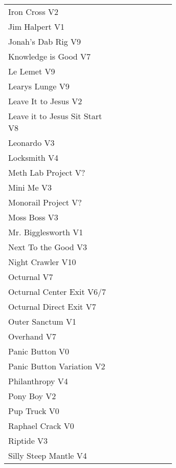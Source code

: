 \begin{center}
\begin{supertabular}{p{0.65\linewidth}r}
Iron Cross V2 & \pageref{vr:Iron Cross} \\
Jim Halpert V1 & \pageref{rt:Jim Halpert} \\
Jonah's Dab Rig V9 & \pageref{rt:Jonah's Dab Rig} \\
Knowledge is Good V7 & \pageref{rt:Knowledge is Good} \\
Le Lemet V9 & \pageref{rt:Le Lemet} \\
Learys Lunge V9 & \pageref{rt:Learys Lunge} \\
Leave It to Jesus V2 & \pageref{rt:Leave It to Jesus} \\
Leave it to Jesus Sit Start V8 & \pageref{vr:Leave it to Jesus Sit Start} \\
Leonardo V3 & \pageref{rt:Leonardo} \\
Locksmith V4 & \pageref{rt:Locksmith} \\
Meth Lab Project V? & \pageref{rt:Meth Lab Project} \\
Mini Me V3 & \pageref{rt:Mini Me} \\
Monorail Project V? & \pageref{rt:Monorail Project} \\
Moss Boss V3 & \pageref{rt:Moss Boss} \\
Mr. Bigglesworth V1 & \pageref{vr:Mr. Bigglesworth} \\
Next To the Good V3 & \pageref{rt:Next To the Good} \\
Night Crawler V10 & \pageref{rt:Night Crawler} \\
Octurnal V7 & \pageref{rt:Octurnal} \\
Octurnal Center Exit V6/7 & \pageref{vr:Octurnal Center Exit} \\
Octurnal Direct Exit V7 & \pageref{vr:Octurnal Direct Exit} \\
Outer Sanctum V1 & \pageref{rt:Outer Sanctum} \\
Overhand V7 & \pageref{rt:Overhand} \\
Panic Button V0 & \pageref{rt:Panic Button} \\
Panic Button Variation V2 & \pageref{vr:Panic Button Variation} \\
Philanthropy V4 & \pageref{rt:Philanthropy} \\
Pony Boy V2 & \pageref{rt:Pony Boy} \\
Pup Truck V0 & \pageref{rt:Pup Truck} \\
Raphael Crack V0 & \pageref{rt:Raphael Crack} \\
Riptide V3 & \pageref{rt:Riptide} \\
Silly Steep Mantle V4 & \pageref{rt:Silly Steep Mantle} \\

\end{supertabular}
\end{center}

